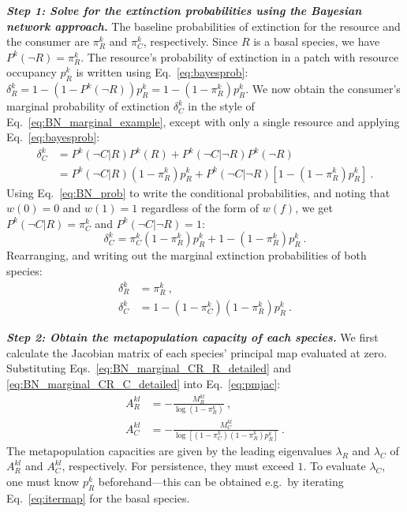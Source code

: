 \documentclass[11pt]{article}
\begin{document}
\textit{\textbf{Step 1: Solve for the extinction probabilities using the Bayesian network approach.}}
The baseline probabilities of extinction for the resource and the consumer are $\pi_R^k$ and $\pi_C^k$, respectively. Since $R$ is a basal species, we have $P^k(\neg R) = \pi_R^k$. The resource's probability of extinction in a patch with resource occupancy $p_R^k$ is written using Eq.~\ref{eq:bayesprob}: $\delta_R^k = 1- (1 - P^k(\neg R)) p_R^k = 1 - (1 - \pi_R^k) p_R^k$. We now obtain the consumer's marginal probability of extinction $\delta_C^k$ in the style of Eq.~\ref{eq:BN_marginal_example}, except with only a single resource and applying Eq.~\ref{eq:bayesprob}:
\begin{equation}
  \label{eq:BN_marginal_CR}
  \begin{split}
    \delta_C^k &= P^k(\neg C|R) P^k(R) + P^k(\neg C|\neg R) P^k(\neg R)
    \\ &= P^k(\neg C|R) (1 - \pi_R^k) p_R^k + P^k(\neg C|\neg R)
    [ 1 - (1 - \pi_R^k) p_R^k ] \ .
  \end{split}
\end{equation}
Using Eq.~\ref{eq:BN_prob} to write the conditional probabilities, and noting that $w(0)=0$ and $w(1)=1$ regardless of the form of $w(f)$, we get $P^k(\neg C|R) = \pi_C^k$ and $P^k(\neg C|\neg R) = 1$:
\begin{equation}
  \label{eq:BN_marginal_CR_2}
  \delta_C^k = \pi_C^k (1 - \pi_R^k) p_R^k + 1 - (1 - \pi_R^k) p_R^k \ .
\end{equation}
Rearranging, and writing out the marginal extinction probabilities of both species:
\begin{align}
  \label{eq:BN_marginal_CR_R_detailed}
  \delta_R^k &= \pi_R^k \ , \\
  \label{eq:BN_marginal_CR_C_detailed}
  \delta_C^k &= 1 - (1 - \pi_C^k) (1 - \pi_R^k) p_R^k \ .
\end{align}

\textit{\textbf{Step 2: Obtain the metapopulation capacity of each species.}}
We first calculate the Jacobian matrix of each species' principal map evaluated at zero. Substituting Eqs.~\ref{eq:BN_marginal_CR_R_detailed} and \ref{eq:BN_marginal_CR_C_detailed} into Eq.~\ref{eq:pmjac}:
\begin{align}
  \label{eq:BN_A_CR_R}
  A_R^{kl} &= -\frac{M_R^{kl}}{\log(1 - \pi_R^k)} \ , \\
  \label{eq:BN_A_CR_C}
  A_C^{kl} &= -\frac{M_C^{kl}}{\log[(1 - \pi_C^k) (1 - \pi_R^k) p_R^k]} \ .
\end{align}
The metapopulation capacities are given by the leading eigenvalues $\lambda_R$ and $\lambda_C$ of $A_R^{kl}$ and $A_C^{kl}$, respectively. For persistence, they must exceed $1$. To evaluate $\lambda_C$, one must know $p_R^k$ beforehand---this can be obtained e.g.\ by iterating Eq.~\ref{eq:itermap} for the basal species.
\end{document}
